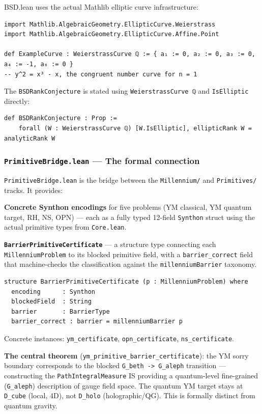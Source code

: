 \documentclass[11pt,a4paper]{article}
\begin{document}
BSD.lean uses the actual Mathlib elliptic curve infrastructure:

\begin{lstlisting}[language=lean]
import Mathlib.AlgebraicGeometry.EllipticCurve.Weierstrass
import Mathlib.AlgebraicGeometry.EllipticCurve.Affine.Point

def ExampleCurve : WeierstrassCurve ℚ := { a₁ := 0, a₂ := 0, a₃ := 0, a₄ := -1, a₆ := 0 }
-- y^2 = x³ - x, the congruent number curve for n = 1
\end{lstlisting}

The \texttt{BSDRankConjecture} is stated using \texttt{WeierstrassCurve ℚ} and \texttt{IsElliptic} directly:

\begin{lstlisting}[language=lean]
def BSDRankConjecture : Prop :=
    forall (W : WeierstrassCurve ℚ) [W.IsElliptic], ellipticRank W = analyticRank W
\end{lstlisting}

\subsubsection{\texttt{PrimitiveBridge.lean} --- The formal connection}

\texttt{PrimitiveBridge.lean} is the bridge between the \texttt{Millennium/} and \texttt{Primitives/} tracks. It provides:

\textbf{Concrete Synthon encodings} for five problems (YM classical, YM quantum target, RH, NS, OPN) --- each as a fully typed 12-field \texttt{Synthon} struct using the actual primitive types from \texttt{Core.lean}.

\textbf{\texttt{BarrierPrimitiveCertificate}} --- a structure type connecting each \texttt{MillenniumProblem} to its blocked primitive field, with a \texttt{barrier\_correct} field that machine-checks the classification against the \texttt{millenniumBarrier} taxonomy.

\begin{lstlisting}[language=lean]
structure BarrierPrimitiveCertificate (p : MillenniumProblem) where
  encoding      : Synthon
  blockedField  : String
  barrier       : BarrierType
  barrier_correct : barrier = millenniumBarrier p
\end{lstlisting}

Concrete instances: \texttt{ym\_certificate}, \texttt{opn\_certificate}, \texttt{ns\_certificate}.

\textbf{The central theorem} (\texttt{ym\_primitive\_barrier\_certificate}): the YM sorry boundary corresponds to the blocked \texttt{G\_beth -\textgreater{} G\_aleph} transition --- constructing the \texttt{PathIntegralMeasure} IS providing a quantum-level fine-grained (\texttt{G\_aleph}) description of gauge field space. The quantum YM target stays at \texttt{D\_cube} (local, 4D), not \texttt{D\_holo} (holographic/QG). This is formally distinct from quantum gravity.
\end{document}
